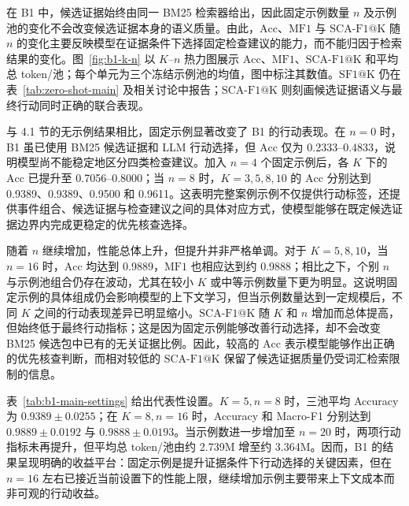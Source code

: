 在 B1 中，候选证据始终由同一 BM25 检索器给出，因此固定示例数量 \(n\) 及示例池的变化不会改变候选证据本身的语义质量。由此，\(\mathrm{Acc}\)、\(\mathrm{MF1}\) 与 \(\mathrm{SCA\mbox{-}F1@K}\) 随 \(n\) 的变化主要反映模型在证据条件下选择固定检查建议的能力，而不能归因于检索结果的变化。图~\ref{fig:b1-k-n} 以 \(K\)--\(n\) 热力图展示 \(\mathrm{Acc}\)、\(\mathrm{MF1}\)、\(\mathrm{SCA\mbox{-}F1@K}\) 和平均总 token/池；每个单元为三个冻结示例池的均值，图中标注其数值。\(\mathrm{SF1@K}\) 仍在表~\ref{tab:zero-shot-main} 及相关讨论中报告；\(\mathrm{SCA\mbox{-}F1@K}\) 则刻画候选证据语义与最终行动同时正确的联合表现。

与 4.1 节的无示例结果相比，固定示例显著改变了 B1 的行动表现。在 \(n=0\) 时，B1 虽已使用 BM25 候选证据和 LLM 行动选择，但 \(\mathrm{Acc}\) 仅为 0.2333--0.4833，说明模型尚不能稳定地区分四类检查建议。加入 \(n=4\) 个固定示例后，各 \(K\) 下的 \(\mathrm{Acc}\) 已提升至 0.7056--0.8000；当 \(n=8\) 时，\(K=3,5,8,10\) 的 \(\mathrm{Acc}\) 分别达到 0.9389、0.9389、0.9500 和 0.9611。这表明完整案例示例不仅提供行动标签，还提供事件组合、候选证据与检查建议之间的具体对应方式，使模型能够在既定候选证据边界内完成更稳定的优先核查选择。

随着 \(n\) 继续增加，性能总体上升，但提升并非严格单调。对于 \(K=5,8,10\)，当 \(n=16\) 时，\(\mathrm{Acc}\) 均达到 0.9889，\(\mathrm{MF1}\) 也相应达到约 0.9888；相比之下，个别 \(n\) 与示例池组合仍存在波动，尤其在较小 \(K\) 或中等示例数量下更为明显。这说明固定示例的具体组成仍会影响模型的上下文学习，但当示例数量达到一定规模后，不同 \(K\) 之间的行动表现差异已明显缩小。\(\mathrm{SCA\mbox{-}F1@K}\) 随 \(K\) 和 \(n\) 增加而总体提高，但始终低于最终行动指标；这是因为固定示例能够改善行动选择，却不会改变 BM25 候选包中已有的无关证据比例。因此，较高的 \(\mathrm{Acc}\) 表示模型能够作出正确的优先核查判断，而相对较低的 \(\mathrm{SCA\mbox{-}F1@K}\) 保留了候选证据质量仍受词汇检索限制的信息。

表~\ref{tab:b1-main-settings} 给出代表性设置。\(K=5,n=8\) 时，三池平均 Accuracy 为 \(0.9389\pm0.0255\)；在 \(K=8,n=16\) 时，Accuracy 和 Macro-F1 分别达到 \(0.9889\pm0.0192\) 与 \(0.9888\pm0.0193\)。当示例数进一步增加至 \(n=20\) 时，两项行动指标未再提升，但平均总 token/池由约 2.739M 增至约 3.364M。因而，B1 的结果呈现明确的收益平台：固定示例是提升证据条件下行动选择的关键因素，但在 \(n=16\) 左右已接近当前设置下的性能上限，继续增加示例主要带来上下文成本而非可观的行动收益。

